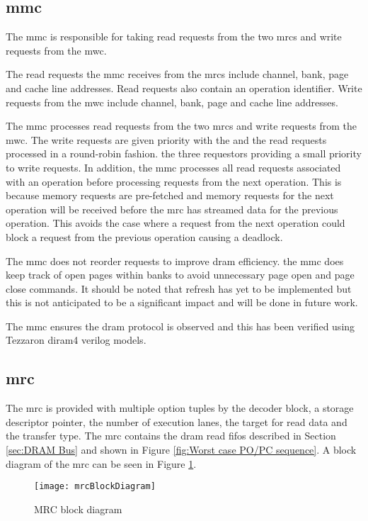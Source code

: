 \subsection{\Acf{mmc}}
\label{sec:MMC}

The \ac{mmc} is responsible for taking read requests from the two \acp{mrc} and write requests from the \ac{mwc}.

The read requests the \ac{mmc} receives from the \acp{mrc} include channel, bank, page and cache line addresses. 
Read requests also contain an operation identifier.
Write requests from the \ac{mwc} include channel, bank, page and cache line addresses. 

The \ac{mmc} processes read requests from the two \acp{mrc} and write requests from the \ac{mwc}.
The write requests are given priority with the  and the read requests processed in a round-robin fashion.
the three requestors providing a small priority to write requests.
In addition, the \ac{mmc} processes all read requests associated with an operation before processing requests from the next operation.
This is because memory requests are pre-fetched and memory requests for the next operation will be received before the \ac{mrc} has streamed data for the previous operation.
This avoids the case where a request from the next operation could block a request from the previous operation causing a deadlock.

The \ac{mmc} does not reorder requests to improve \ac{dram} efficiency. 
the \ac{mmc} does keep track of open pages within banks to avoid unnecessary page open and page close commands.
It should be noted that refresh has yet to be implemented but this is not anticipated to be a significant impact and will be done in future work.

The \ac{mmc} ensures the \ac{dram} protocol is observed and this has been verified using Tezzaron \ac{diram4} verilog models.


\subsection{\Acf{mrc}}
\label{sec:MRC}

The \ac{mrc} is provided with multiple option tuples by the decoder block, a storage descriptor pointer, the number of execution lanes, the target for read data and the transfer type.
The \ac{mrc} contains the \ac{dram} read \acp{fifo} described in Section \ref{sec:DRAM Bus} and shown in Figure \ref{fig:Worst case PO/PC sequence}.
A block diagram of the \ac{mrc} can be seen in Figure \ref{fig:MRC block diagram}.
\begin{figure}[h]
\centering
\captionsetup{justification=centering}
\captionsetup{width=.9\linewidth}
\centerline{
\mbox{\texttt{[image: mrcBlockDiagram]}}
}
\center\caption{MRC block diagram}
\label{fig:MRC block diagram}
\end{figure}


